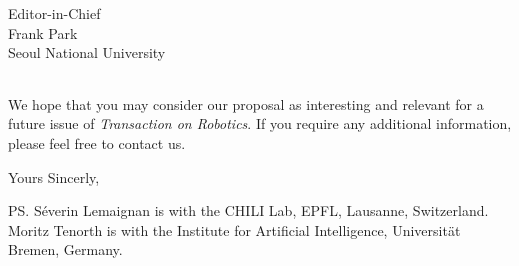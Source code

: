 \documentclass{letter}
\begin{document}
\begin{letter}{Editor-in-Chief \\ Frank Park \\ Seoul National University}
\begin{tabular}{p{2.8cm}p{8cm}p{1.5cm}}
\end{tabular}



We hope that you may consider our proposal as interesting and relevant for a 
future issue of \emph{Transaction on Robotics}. If you require any additional 
information, please feel free to contact us.

\closing{Yours Sincerly,}

\ps{Séverin Lemaignan is with the CHILI Lab, EPFL, Lausanne, Switzerland.\\ 
    Moritz Tenorth is with the Institute for Artificial Intelligence, Universität Bremen, Germany.}


\end{letter}



\end{document}
